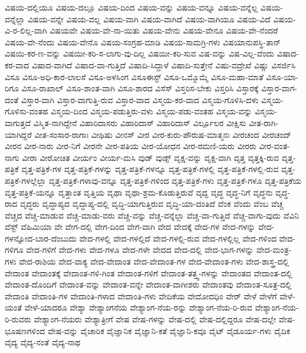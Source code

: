 {ವಿಷಯ-ದಲ್ಲಿಯೂ
ವಿಷಯ-ದಲ್ಲೂ
ವಿಷಯ-ದಿಂದ
ವಿಷಯ-ವನ್ನು
ವಿಷಯ-ವನ್ನೂ
ವಿಷಯ-ವನ್ನೆಲ್ಲ
ವಿಷಯ-ವನ್ನೆಲ್ಲಾ
ವಿಷಯ-ವನ್ನೇ
ವಿಷಯ-ವಲ್ಲ
ವಿಷಯ-ವಾಗಿ
ವಿಷಯ-ವಾಗಿದೆ
ವಿಷಯ-ವಾಗಿಯೂ
ವಿಷಯ-ವಿದೆ
ವಿಷಯ-ವಿ-ರ-ಲಿಲ್ಲ-ವಾಗಿ
ವಿಷಯವೇ
ವಿಷಯ-ವೇ-ನಾ-ಯಿತು
ವಿಷಯ-ವೇನು
ವಿಷಯ-ವೇನೂ
ವಿಷಯ-ವೇ-ನೆಂದರೆ
ವಿಷಯ-ವೇ-ನೆಂದು
ವಿಷಯ-ವೇನೊ
ವಿಷಯ-ಸಂಗ್ರಹ-ಮಾಡಿ
ವಿಷಯ-ಸಾಮಗ್ರಿ-ಗಳು
ವಿಷಯಾನುಪಸ್ಥಿ-ತಾನ್
ವಿಷಯಿ-ಕರ-ಣ-ವನ್ನು
ವಿಷಯೀ-ಕರಿ-ಸ-ಲಾಗು-ವು-ದಿಲ್ಲ
ವಿಷಯೀ-ಕರಿ-ಸುವ
ವಿಷ-ವನ್ನು
ವಿಷ-ವಿಲ್ಲ-ವೆಂದು
ವಿಷಾದ-ಕರ-ವಾದ
ವಿಷಾದ-ವಾಗಿದೆ
ವಿಷಾದ-ವಾ-ಗುತ್ತಿದೆ
ವಿಷಾದಿ-ಸಿದ್ದಾಳೆ
ವಿಷಾದಿ-ಸುತ್ತೇನೆ
ವಿಷು-ವದ್ರೇಖೆ
ವಿಷ್ಣು
ವಿಸರ್ಜಿಸಿ
ವಿಸೂ
ವಿಸೂ-ಅಧಿ-ಕಾರ-ಲಾಲಸೆ
ವಿಸೂ-ಅಳಸಿಂಗ
ವಿಸೂಈಸ್ಟ್
ವಿಸೂ-ಒಮ್ಮೊಮ್ಮೆ
ವಿಸೂ-ಮಹಾ-ಮಾತೆ
ವಿಸೂ-ಯಾ-ರಿಗೂ
ವಿಸೂ-ರಾಖಾಲ್
ವಿಸೂ-ಶಾಂತ-ವಾಗಿ
ವಿಸೂ-ಶಾರದ
ವಿಸೆಸ್
ವಿಸ್ತರಿಸ-ಬೇಕು
ವಿಸ್ತರಿಸಿ
ವಿಸ್ತಾರಕ್ಕೆ
ವಿಸ್ತಾರ-ವಾಗ-ದಂತೆ
ವಿಸ್ತಾರ-ವಾಗಿ
ವಿಸ್ತಾರ-ವಾಗುತ್ತಿ-ರುವ
ವಿಸ್ತಾರ-ವಾದ
ವಿಸ್ಮಯ-ಕರ-ವಾದ
ವಿಸ್ಮಯ-ಗೊಳಿಸಿ-ದಳು
ವಿಸ್ಮಯ-ಗೊಳಿಸು-ವಂತಹ
ವಿಸ್ಮಯ-ದಿಂದ
ವಿಸ್ಮಯ-ಪಡುತ್ತಿರು-ವಳು
ವಿಸ್ಮಯ-ಪಡು-ವಂತಹ
ವಿಸ್ಮಯ-ವನ್ನು
ವಿಸ್ಮಯ-ವಾಗುತ್ತದೆ
ವಿಸ್ಮಿತ-ನಾಗಿದ್ದೇನೆ
ವಿಹಾರಿದಾಸರು
ವಿಹಾರಿದಾಸ್
ವಿಹಾರಿದಾಸ್
ವಿರ್ಲ್ಪೂಲರ
ವೀಕ್ಷಿಸು
ವೀತ-ರಾಗಿ-ಯಾಗಿದ್ದರೆ
ವೀತ-ಸಂಸಾರ-ರಾಗಾಃ
ವೀಥಿಷು
ವೀನಸ್
ವೀರ
ವೀರ-ಕುರು-ಪೌರುಷ-ಮಾತ್ಮನಃ
ವೀರಚಂದ
ವೀರಚಂದ್
ವೀರನ
ವೀರ-ನಾರು
ವೀರ-ನಿಗೆ
ವೀರನೇ
ವೀರ-ಪತಿಯ
ವೀರ-ಯೋಧನ
ವೀರ-ರಮಣಿ-ಯರು
ವೀರರು
ವೀರ-ವಂತ-ನಾಗು
ವೀರಾ
ವೀರೋಚಿತ
ವೀರ್ಯಂ
ವೀರ್ಯ-ಮಸಿ
ವುಡ್
ವುಡ್ಸ್
ವೃಕ್ಷ-ವನ್ನು
ವೃಕ್ಷ-ವಾಗಿ
ವೃತ್ತ
ವೃತ್ತಕ್ಕಿ-ರುವ
ವೃತ್ತ-ಪತ್ರಿಕೆ
ವೃತ್ತ-ಪತ್ರಿಕೆ-ಗಳ
ವೃತ್ತ-ಪತ್ರಿಕೆ-ಗಳನ್ನು
ವೃತ್ತ-ಪತ್ರಿಕೆ-ಗಳನ್ನೂ
ವೃತ್ತ-ಪತ್ರಿಕೆ-ಗಳಲ್ಲಿ
ವೃತ್ತ-ಪತ್ರಿಕೆ-ಗಳಲ್ಲಿ-ರುವ
ವೃತ್ತ-ಪತ್ರಿಕೆ-ಗಳಲ್ಲೆಲ್ಲಾ
ವೃತ್ತ-ಪತ್ರಿಕೆ-ಗಳಾವು-ವನ್ನೂ
ವೃತ್ತ-ಪತ್ರಿಕೆ-ಗಳಿಂದ
ವೃತ್ತ-ಪತ್ರಿಕೆ-ಗಳು
ವೃತ್ತ-ಪತ್ರಿಕೆ-ಗಳೂ
ವೃತ್ತ-ಪತ್ರಿಕೆಯ
ವೃತ್ತ-ಪತ್ರಿಕೆ-ಯನ್ನೂ
ವೃತ್ತಾಂತ
ವೃತ್ತಿಯ
ವೃಥಾ
ವೃಥಾ-ಶ್ರಮ-ಕೊಡುತ್ತಿರುವೆ
ವೃದ್ದ
ವೃದ್ಧ
ವೃದ್ಧ-ನಿಗೆ
ವೃದ್ಧನು
ವೃದ್ಧ-ರಾದ
ವೃದ್ಧರು
ವೃದ್ಧಾಪ್ಯದ
ವೃದ್ಧಾಪ್ಯ-ದಲ್ಲಿ
ವೃದ್ಧಿ-ಯಾಗುತ್ತಿರುವ
ವೃದ್ಧಿ-ಯಾ-ದಂತಿದೆ
ವೆಂಕ
ವೆಂದು
ವೆಂಬ
ವೆಚ್ಚ
ವೆಚ್ಚದ
ವೆಚ್ಚ-ಮಾಡುವ
ವೆಚ್ಚ-ಮಾಡು-ವರು
ವೆಚ್ಚ-ವನ್ನು
ವೆಚ್ಚ-ವನ್ನೆಲ್ಲಾ
ವೆಚ್ಚ-ವಾ-ಗುತ್ತಿದೆ
ವೆಚ್ಚ-ವಾಗು-ವುದು
ವೆವಿನಿ
ವೆಸ್ಟ್
ವೆಹಿಮಿಯಾ
ವೇ
ವೇಗ-ದಲ್ಲಿ
ವೇಗ-ದಿಂದ
ವೇಗ-ವಾಗಿ
ವೇದ
ವೇದಕ್ಕೆ
ವೇದ-ಗಳ
ವೇದ-ಗಳನ್ನು
ವೇದ-ಗಳನ್ನೋದ-ಬಾರ-ದೆಂಬುದು
ವೇದ-ಗಳಲ್ಲಿ
ವೇದ-ಗಳಲ್ಲಿದೆ
ವೇದ-ಗಳಲ್ಲಿ-ರುವ
ವೇದ-ಗಳಲ್ಲಿಲ್ಲ
ವೇದ-ಗಳಿಂದ
ವೇದ-ಗಳಿಗೂ
ವೇದ-ಗಳಿಗೆ
ವೇದ-ಗಳು
ವೇದ-ಗಳೂ
ವೇದ-ಗಳೇ
ವೇದದ
ವೇದ-ದಲ್ಲಿ
ವೇದ-ಭಾಗ-ಗಳನ್ನು
ವೇದ-ಮಂತ್ರ-ಗಳು
ವೇದ-ರಾಶಿಯ
ವೇದ-ವಾಕ್ಯ
ವೇದ-ವೇದಾಂತ
ವೇದ-ವೇದಾಂತ-ಗಳ
ವೇದ-ವೇದಾಂತ-ಗಳು
ವೇದ-ಶಾಸ್ತ್ರ-ದಲ್ಲಿ
ವೇದಾಂತ
ವೇದಾಂತಕ್ಕೆ
ವೇದಾಂತ-ಗಳಿ-ಗಿಂತ
ವೇದಾಂತ-ಗಳಿಗೆ
ವೇದಾಂತ-ತತ್ತ್ವ-ಗಳನ್ನು
ವೇದಾಂತದ
ವೇದಾಂತ-ದಲ್ಲಿ
ವೇದಾಂತ-ದೊಂದಿಗೆ
ವೇದಾಂತ-ವನ್ನು
ವೇದಾಂತ-ವನ್ನೇ
ವೇದಾಂತ-ವಾಗೀಶರು
ವೇದಾಂತವು
ವೇದಾಂತ-ಸೂತ್ರ-ದಲ್ಲಿ
ವೇದಾಂತಿ
ವೇದಾಂತಿ-ಗಳ
ವೇದಾಂತಿ-ಗಳಾದ
ವೇದಾಂತಿ-ಗಳು
ವೇದಿಕೆಯ
ವೇದೋದಧಿಂ
ವೇರ್
ವೇಳೆ
ವೇಳೆಗೆ
ವೇಳೆ-ಯಂತೆ
ವೇಳೆ-ಯಾದರೂ
ವೇಶ್ಯಾ
ವೇಶ್ಯಾಂಗನೆಯ
ವೇಶ್ಯಾಂಗ-ನೆಯ-ರನ್ನು
ವೇಶ್ಯಾಂಗ-ನೆಯ-ರಿ-ರುವ
ವೇಶ್ಯಾಂಗ-ನೆಯ-ರಿ-ರುವರು
ವೇಶ್ಯಾಂಗ-ನೆಯರು
ವೇಶ್ಯಾತ್ರೀಗೆ
ವೇಷ
ವೇಷ-ಗಳನ್ನು
ವೇಷ-ದಲ್ಲಿ
ವೇಷ-ದಲ್ಲಿದ್ದರೂ
ವೇಷ-ದಲ್ಲೇ
ವೇಷ-ಭೂಷಣಗಳಿಂದ
ವೇಷ-ವನ್ನು
ವೈಚಾರಿಕ
ವೈಜ್ಞಾನಿಕ
ವೈಜ್ಞಾನಿ-ಕತೆ
ವೈಜ್ಞಾನಿ-ಕವೂ
ವೈಟ್
ವೈಡೂರ್ಯ-ಗಳು
ವೈದಿಕ
ವೈದ್ಯ
ವೈದ್ಯ-ನಂತೆ
ವೈದ್ಯ-ನಾಥ
}
